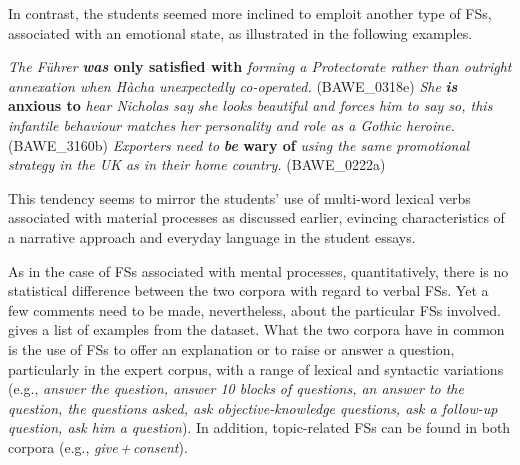 \documentclass[output=paper]{langscibook}
\begin{document}
In contrast, the students seemed more inclined to emploit another type of FSs, associated with an emotional state, as illustrated in the following examples. 

\ea \textit{The Führer} \textbf{\textit{was} \textbf{only} \textbf{satisfied} \textbf{with}} \textit{forming a Protectorate rather than outright annexation when Hàcha unexpectedly co-operated.} (BAWE\_0318e)
\ex \textit{She} \textbf{\textit{is} \textbf{anxious} \textbf{to}} \textit{hear Nicholas say she looks beautiful and forces him to say so, this infantile behaviour matches her personality and role as a Gothic heroine.} (BAWE\_3160b)
\ex \textit{Exporters need to} \textbf{\textit{be} \textbf{wary} \textbf{of}} \textit{using the same promotional strategy in the UK as in their home country.} (BAWE\_0222a)
\z

This tendency seems to mirror the students’ use of multi-word lexical verbs associated with material processes as discussed earlier, evincing characteristics of a narrative approach and everyday language in the student essays.

As in the case of FSs associated with mental processes, quantitatively, there is no statistical difference between the two corpora with regard to verbal FSs. Yet a few comments need to be made, nevertheless, about the particular FSs involved.  gives a list of examples from the dataset. What the two corpora have in common is the use of FSs to offer an explanation or to raise or answer a question, particularly in the expert corpus, with a range of lexical and syntactic variations (e.g., \textit{answer the question, answer 10 blocks of questions, an answer to the question, the questions asked, ask objective-knowledge questions, ask a follow-up question, ask him a question}). In addition, topic-related FSs can be found in both corpora (e.g., \textit{give\,+\,consent}). 
\end{document}
